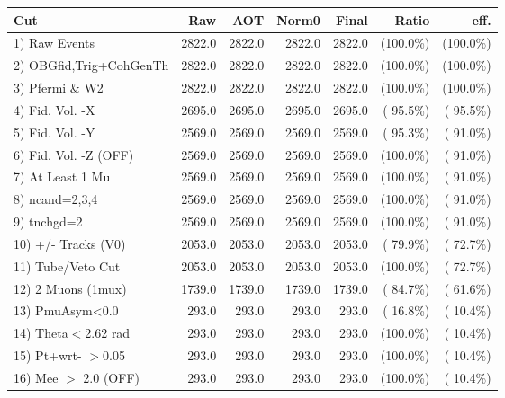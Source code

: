  \begin{table}[h!]\centering
 \begin{tabular}{||l||r|r|r|r|r|r||}
 \hline
 \hline
 Cut & Raw & AOT & Norm0 & Final & Ratio & eff.       \\
 \hline
  1) Raw Events           &       2822.0 &       2822.0 &       2822.0 &       2822.0 & (100.0\%) & (100.0\%) \\
  2) OBGfid,Trig+CohGenTh &       2822.0 &       2822.0 &       2822.0 &       2822.0 & (100.0\%) & (100.0\%) \\
  3) Pfermi \& W2         &       2822.0 &       2822.0 &       2822.0 &       2822.0 & (100.0\%) & (100.0\%) \\
  4) Fid. Vol. -X         &       2695.0 &       2695.0 &       2695.0 &       2695.0 & ( 95.5\%) & ( 95.5\%) \\
  5) Fid. Vol. -Y         &       2569.0 &       2569.0 &       2569.0 &       2569.0 & ( 95.3\%) & ( 91.0\%) \\
  6) Fid. Vol. -Z (OFF)   &       2569.0 &       2569.0 &       2569.0 &       2569.0 & (100.0\%) & ( 91.0\%) \\
  7) At Least 1 Mu        &       2569.0 &       2569.0 &       2569.0 &       2569.0 & (100.0\%) & ( 91.0\%) \\
  8) ncand=2,3,4          &       2569.0 &       2569.0 &       2569.0 &       2569.0 & (100.0\%) & ( 91.0\%) \\
  9) tnchgd=2             &       2569.0 &       2569.0 &       2569.0 &       2569.0 & (100.0\%) & ( 91.0\%) \\
 10) +/- Tracks (V0)      &       2053.0 &       2053.0 &       2053.0 &       2053.0 & ( 79.9\%) & ( 72.7\%) \\
 11) Tube/Veto Cut        &       2053.0 &       2053.0 &       2053.0 &       2053.0 & (100.0\%) & ( 72.7\%) \\
 12) 2 Muons (1mux)       &       1739.0 &       1739.0 &       1739.0 &       1739.0 & ( 84.7\%) & ( 61.6\%) \\
 13) PmuAsym<0.0          &        293.0 &        293.0 &        293.0 &        293.0 & ( 16.8\%) & ( 10.4\%) \\
 14) Theta$<$2.62 rad     &        293.0 &        293.0 &        293.0 &        293.0 & (100.0\%) & ( 10.4\%) \\
 15) Pt+wrt- $>$0.05      &        293.0 &        293.0 &        293.0 &        293.0 & (100.0\%) & ( 10.4\%) \\
 16) Mee $>$ 2.0  (OFF)   &        293.0 &        293.0 &        293.0 &        293.0 & (100.0\%) & ( 10.4\%) \\

\end{tabular}
\end{table}

